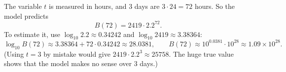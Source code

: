 The variable $t$ is measured in hours, and $3$ days are $3\cdot24=72$ hours. So the model predicts
\[B(72)=\boxed{2419\cdot2.2^{72}}.\]
To estimate it, use $\log_{10}2.2\approx0.34242$ and $\log_{10}2419\approx3.38364$:
\[\log_{10}B(72)\approx3.38364+72\cdot0.34242\approx28.0381,\qquad B(72)\approx10^{0.0381}\cdot10^{28}\approx\boxed{1.09\times10^{28}}.\]
(Using $t=3$ by mistake would give $2419\cdot2.2^3\approx25758$. The huge true value shows that the model makes no sense over $3$ days.)
